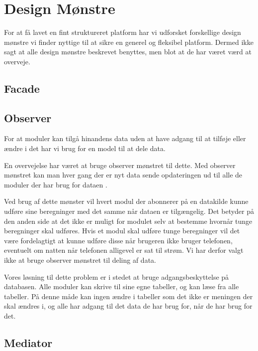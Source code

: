 \section{Design Mønstre}
For at få lavet en fint struktureret platform har vi udforsket forskellige design mønstre vi finder nyttige til at sikre en generel og fleksibel platform.
Dermed ikke sagt at alle design mønstre beskrevet benyttes, men blot at de har været værd at overveje.

\subsection{Facade}

\subsection{Observer}
For at moduler kan tilgå hinandens data uden at have adgang til at tilføje eller ændre i det har vi brug for en model til at dele data.

En overvejelse har været at bruge observer mønstret til dette.
Med observer mønstret kan man hver gang der er nyt data sende opdateringen ud til alle de moduler der har brug for dataen \cite[p.~244]{gamma1994design}.

Ved brug af dette mønster vil hvert modul der abonnerer på en datakilde kunne udføre sine beregninger med det samme når dataen er tilgængelig.
Det betyder på den anden side at det ikke er muligt for modulet selv at bestemme hvornår tunge beregninger skal udføres.
Hvis et modul skal udføre tunge beregninger vil det være fordelagtigt at kunne udføre disse når brugeren ikke bruger telefonen, eventuelt om natten når telefonen alligevel er sat til strøm.
Vi har derfor valgt ikke at bruge observer mønstret til deling af data.




Vores løsning til dette problem er i stedet at bruge adgangsbeskyttelse på databasen.
Alle moduler kan skrive til sine egne tabeller, og kan læse fra alle tabeller.
På denne måde kan ingen ændre i tabeller som det ikke er meningen der skal ændres i, og alle har adgang til det data de har brug for, når de har brug for det.

\subsection{Mediator}